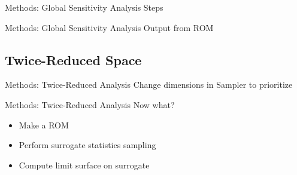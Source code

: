 \documentclass[t,9pt,svgnames]{beamer}
\begin{document}
\begin{frame}[fragile]{Methods: Global Sensitivity Analysis}
  \vfill
  Steps
  
  \vfill
\end{frame}

\begin{frame}[fragile]{Methods: Global Sensitivity Analysis}
  \vfill
  Output from ROM
  
  \vfill
\end{frame}

\subsection{Twice-Reduced Space}
\begin{frame}[fragile]{Methods: Twice-Reduced Analysis}
  \vfill
  Change dimensions in Sampler to prioritize
  
  \vfill
\end{frame}

\begin{frame}[fragile]{Methods: Twice-Reduced Analysis}
  \vfill
  Now what?
  \vfill
  \begin{itemize}
    \item Make a ROM
  \vfill
    \item Perform surrogate statistics sampling
  \vfill
    \item Compute limit surface on surrogate
  \end{itemize}
  \vfill
\end{frame}
\end{document}
